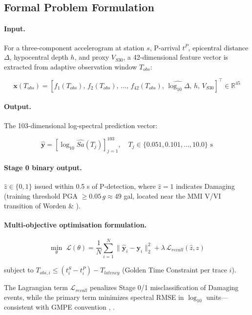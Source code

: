 \documentclass[10pt]{article}
\renewcommand{\cite}[1]{\citep{#1}}
\begin{document}
\subsection{Formal Problem Formulation}

\paragraph{Input.} For a three-component accelerogram at station \(s\), P-arrival \(t^P\), epicentral distance \(\Delta\), hypocentral depth \(h\), and proxy \(V_{S30}\), a 42-dimensional feature vector is extracted from adaptive observation window \(T_{obs}\):

\[\mathbf{x}(T_{obs}) = \left[f_1(T_{obs}),\, f_2(T_{obs}),\, \ldots,\, f_{42}(T_{obs}),\, \widehat{\log_{10}\Delta},\, h,\, V_{S30}\right]^\top \in \mathbb{R}^{45}\]

\paragraph{Output.} The 103-dimensional log-spectral prediction vector:

\[\hat{\mathbf{y}} = \left[\log_{10}\widehat{Sa}(T_j)\right]_{j=1}^{103}, \quad T_j \in \{0.051, 0.101, \ldots, 10.0\}\text{ s}\]

\paragraph{Stage 0 binary output.} \(\hat{z} \in \{0, 1\}\) issued within 0.5 s of P-detection, where \(\hat{z} = 1\) indicates Damaging (training threshold PGA \(\geq 0.05\,g \approx 49\) gal, located near the MMI V/VI transition of Worden \& \citet{ref45}).

\paragraph{Multi-objective optimisation formulation.}

\[\underset{\theta}{\min}\; \mathcal{L}(\theta) = \frac{1}{N} \sum_{i=1}^{N} \|\hat{\mathbf{y}}_i - \mathbf{y}_i\|^2_2 + \lambda\, \mathcal{L}_{recall}(\hat{z}, z)\]

subject to \(T_{obs,i} \leq (t^S_i - t^P_i) - T_{latency}\) (Golden Time Constraint per trace \(i\)).

The Lagrangian term \(\mathcal{L}_{recall}\) penalizes Stage 0/1 misclassification of Damaging events, while the primary term minimizes spectral RMSE in \(\log_{10}\) units---consistent with GMPE convention \cite{ref48}, \cite{ref49}.
\end{document}
